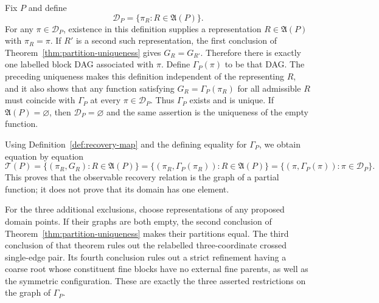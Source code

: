 Fix \(P\) and define
\[
 \mathcal D_P=\{\pi_R:R\in\mathfrak A(P)\}.
\]
For any \(\pi\in\mathcal D_P\), existence in this definition supplies a
representation \(R\in\mathfrak A(P)\) with \(\pi_R=\pi\).  If \(R'\) is a
second such representation, the first conclusion of
Theorem~\ref{thm:partition-uniqueness} gives \(G_R=G_{R'}\).  Therefore there
is exactly one labelled block DAG associated with \(\pi\).  Define
\(\Gamma_P(\pi)\) to be that DAG.  The preceding uniqueness makes this
definition independent of the representing \(R\), and it also shows that any
function satisfying \(G_R=\Gamma_P(\pi_R)\) for all admissible \(R\) must
coincide with \(\Gamma_P\) at every \(\pi\in\mathcal D_P\).  Thus
\(\Gamma_P\) exists and is unique.  If \(\mathfrak A(P)=\varnothing\), then
\(\mathcal D_P=\varnothing\) and the same assertion is the uniqueness of the
empty function.

Using Definition~\ref{def:recovery-map} and the defining equality for
\(\Gamma_P\), we obtain equation by equation
\[
 \mathcal T(P)
 =\{(\pi_R,G_R):R\in\mathfrak A(P)\}
 =\{(\pi_R,\Gamma_P(\pi_R)):R\in\mathfrak A(P)\}
 =\{(\pi,\Gamma_P(\pi)):\pi\in\mathcal D_P\}.
\]
This proves that the observable recovery relation is the graph of a partial
function; it does not prove that its domain has one element.

For the three additional exclusions, choose representations of any proposed
domain points.  If their graphs are both empty, the second conclusion of
Theorem~\ref{thm:partition-uniqueness} makes their partitions equal.  The
third conclusion of that theorem rules out the relabelled three-coordinate
crossed single-edge pair.  Its fourth conclusion rules out a strict refinement
having a coarse root whose constituent fine blocks have no external fine
parents, as well as the symmetric configuration.  These are exactly the three
asserted restrictions on the graph of \(\Gamma_P\).